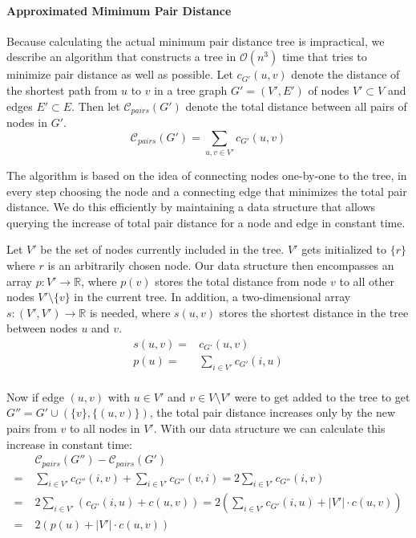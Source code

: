 \documentclass[a4paper, oneside]{discothesis}
\begin{document}
\paragraph{Approximated Mimimum Pair Distance}

Because calculating the actual minimum pair distance tree is impractical, we describe an algorithm that constructs a tree in $\mathcal{O}(n^3)$ time that tries to minimize pair distance as well as possible. Let $c_{G'}(u, v)$ denote the distance of the shortest path from $u$ to $v$ in a tree graph $G'=(V',E')$ of nodes $V'\subset V$ and edges $E'\subset E$. Then let $\mathcal{C}_{pairs}(G')$ denote the total distance between all pairs of nodes in $G'$.
\begin{equation}
\mathcal{C}_{pairs}(G') = \sum_{u,v\in V'}c_{G'}(u,v)
\end{equation}

The algorithm is based on the idea of connecting nodes one-by-one to the tree, in every step choosing the node and a connecting edge that minimizes the total pair distance. We do this efficiently by maintaining a data structure that allows querying the increase of total pair distance for a node and edge in constant time.

Let $V'$ be the set of nodes currently included in the tree. $V'$ gets initialized to $\{r\}$ where $r$ is an arbitrarily chosen node. Our data structure then encompasses an array $p:V'\to\mathbb{R}$, where $p(v)$ stores the total distance from node $v$ to all other nodes $V'\setminus\{v\}$ in the current tree. In addition, a two-dimensional array $s:(V',V')\to\mathbb{R}$ is needed, where $s(u,v)$ stores the shortest distance in the tree between nodes $u$ and $v$.
\begin{equation}
\begin{split}
s(u,v)=&c_{G'}(u,v)\\
p(u)=&\sum_{i\in V'}c_{G'}(i,u) \\
\end{split}
\end{equation}

Now if edge $(u,v)$ with $u\in V'$ and $v\in V\setminus V'$ were to get added to the tree to get $G''=G'\cup(\{v\}, \{(u,v)\})$, the total pair distance increases only by the new pairs from $v$ to all nodes in $V'$. With our data structure we can calculate this increase in constant time:
\begin{equation}
\begin{split}
& \mathcal{C}_{pairs}(G'')-\mathcal{C}_{pairs}(G') \\
=\;&\sum_{i\in V'}c_{G''}(i, v)+\sum_{i\in V'}c_{G''}(v, i)=2\sum_{i\in V'}c_{G''}(i, v) \\
=\;&2\sum_{i\in V'}\left(c_{G'}(i,u)+c(u,v)\right)=2\left(\sum_{i\in V'}c_{G'}(i,u)+|V'|\cdot c(u,v)\right) \\
=\;&2\left(p(u)+|V'|\cdot c(u,v)\right) \\
\end{split}
\end{equation}
\end{document}
